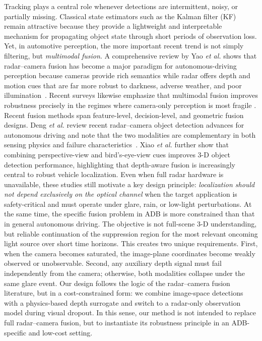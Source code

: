 \documentclass[pdflatex,sn-mathphys-num]{sn-jnl}%
\theoremstyle{thmstyleone}%
\theoremstyle{thmstyletwo}%
\theoremstyle{thmstylethree}%
\begin{document}
Tracking plays a central role whenever detections are intermittent, noisy, or partially missing. Classical state estimators such as the Kalman filter (KF) remain attractive because they provide a lightweight and interpretable mechanism for propagating object state through short periods of observation loss. Yet, in automotive perception, the more important recent trend is not simply filtering, but \emph{multimodal
fusion}. A comprehensive review by Yao \emph{et al.} shows that radar--camera fusion has become a major paradigm for autonomous-driving perception because cameras provide rich semantics while radar offers
depth and motion cues that are far more robust to darkness, adverse weather, and poor illumination~\cite{yao2023radar}. Recent
surveys likewise emphasize that multimodal fusion improves robustness precisely in the regimes where camera-only perception is most fragile \cite{qian2025review}.
Recent fusion methods span feature-level, decision-level, and geometric fusion designs. Deng \emph{et al.} review recent radar--camera object detection advances for autonomous driving and note that the two modalities are complementary in both sensing physics and failure characteristics~\cite{deng2025advances}. Xiao \emph{et al.} \cite{xiao2025radar} further show that combining perspective-view and bird's-eye-view cues improves 3-D object detection performance, highlighting that depth-aware fusion is increasingly central to robust vehicle localization. Even when full radar hardware is unavailable, these studies still motivate a key design principle: \emph{localization should not depend exclusively on the optical channel}
when the target application is safety-critical and must operate under glare, rain, or low-light perturbations.
At the same time, the specific fusion problem in ADB is more constrained than that in general autonomous driving. The objective is not full-scene 3-D understanding, but reliable continuation of the suppression region for
the most relevant oncoming light source over short time horizons. This creates two unique requirements. First, when the camera becomes saturated,
the image-plane coordinates become weakly observed or unobservable. Second, any auxiliary depth signal must fail independently from the camera; otherwise, both modalities collapse under the same glare event. Our design follows the logic of the radar--camera fusion literature, but in a cost-constrained form: we combine image-space detections with a physics-based depth surrogate and switch to a radar-only observation model during visual dropout. In this sense, our method is not intended to replace full radar--camera fusion, but to instantiate its robustness principle in an ADB-specific and low-cost setting.
\end{document}
